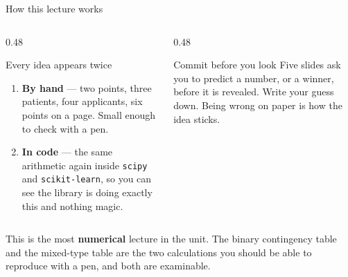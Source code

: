 \documentclass[aspectratio=169]{beamer}
\begin{document}
\begin{frame}[shrink=14]{How this lecture works}
  \begin{columns}[T]
    \begin{column}{0.48\textwidth}
      \begin{block}{Every idea appears twice}
        \begin{enumerate}
          \item \textbf{By hand} --- two points, three patients, four
            applicants, six points on a page. Small enough to check with a
            pen.
          \item \textbf{In code} --- the same arithmetic again inside
            \texttt{scipy} and \texttt{scikit-learn}, so you can see the
            library is doing exactly this and nothing magic.
        \end{enumerate}
      \end{block}
    \end{column}
    \begin{column}{0.48\textwidth}
      \begin{alertblock}{Commit before you look}
        Five slides ask you to predict a number, or a winner, before it is
        revealed. Write your guess down. Being wrong on paper is how the
        idea sticks.
      \end{alertblock}
    \end{column}
  \end{columns}
  \vspace{0.4em}
  \begin{center}
    \small This is the most \textbf{numerical} lecture in the unit. The
    binary contingency table and the mixed-type table are the two
    calculations you should be able to reproduce with a pen, and both are
    examinable.
  \end{center}
\end{frame}
\end{document}
